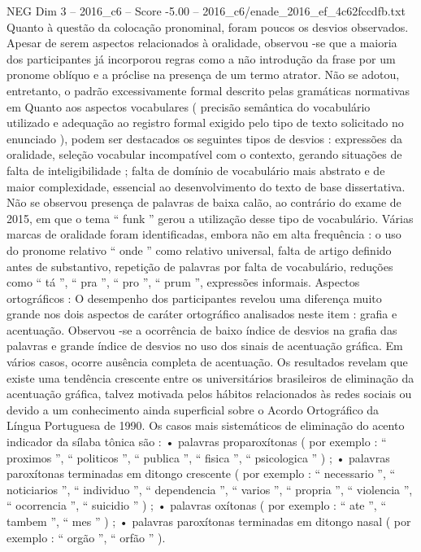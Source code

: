 \begin{textsample}{NEG Dim 3 – 2016\_c6 – Score -5.00 – 2016\_c6/enade\_2016\_ef\_4c62fccdfb.txt}
Quanto à questão da colocação pronominal, foram poucos os desvios observados.
Apesar de serem aspectos relacionados à oralidade, observou -se que a maioria dos participantes já incorporou regras como a não introdução da frase por um pronome oblíquo e a próclise na presença de um termo atrator.
Não se adotou, entretanto, o padrão excessivamente formal descrito pelas gramáticas normativas em Quanto aos aspectos vocabulares ( precisão semântica do vocabulário utilizado e adequação ao registro formal exigido pelo tipo de texto solicitado no enunciado ), podem ser destacados os seguintes tipos de desvios : expressões da oralidade, seleção vocabular incompatível com o contexto, gerando situações de falta de inteligibilidade ; falta de domínio de vocabulário mais abstrato e de maior complexidade, essencial ao desenvolvimento do texto de base dissertativa.
Não se observou presença de palavras de baixa calão, ao contrário do exame de 2015, em que o tema “ funk ” gerou a utilização desse tipo de vocabulário.
Várias marcas de oralidade foram identificadas, embora não em alta frequência : o uso do pronome relativo “ onde ” como relativo universal, falta de artigo definido antes de substantivo, repetição de palavras por falta de vocabulário, reduções como “ tá ”, “ pra ”, “ pro ”, “ prum ”, expressões informais.
Aspectos ortográficos : O desempenho dos participantes revelou uma diferença muito grande nos dois aspectos de caráter ortográfico analisados neste item : grafia e acentuação.
Observou -se a ocorrência de baixo índice de desvios na grafia das palavras e grande índice de desvios no uso dos sinais de acentuação gráfica.
Em vários casos, ocorre ausência completa de acentuação.
Os resultados revelam que existe uma tendência crescente entre os universitários brasileiros de eliminação da acentuação gráfica, talvez motivada pelos hábitos relacionados às redes sociais ou devido a um conhecimento ainda superficial sobre o Acordo Ortográfico da Língua Portuguesa de 1990.
Os casos mais sistemáticos de eliminação do acento indicador da sílaba tônica são : • palavras proparoxítonas ( por exemplo : “ proximos ”, “ politicos ”, “ publica ”, “ fisica ”, “ psicologica ” ) ; • palavras paroxítonas terminadas em ditongo crescente ( por exemplo : “ necessario ”, “ noticiarios ”, “ individuo ”, “ dependencia ”, “ varios ”, “ propria ”, “ violencia ”, “ ocorrencia ”, “ suicidio ” ) ; • palavras oxítonas ( por exemplo : “ ate ”, “ tambem ”, “ mes ” ) ; • palavras paroxítonas terminadas em ditongo nasal ( por exemplo : “ orgão ”, “ orfão ” ).

\end{textsample}
